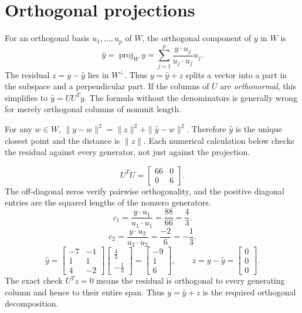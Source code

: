 \section{Orthogonal projections}
For an orthogonal basis $u_1,\ldots,u_p$ of $W$, the orthogonal component
of $y$ in $W$ is
\[
\widehat y=\operatorname{proj}_Wy
=\sum_{j=1}^p\frac{y\cdot u_j}{u_j\cdot u_j}u_j.
\]
The residual $z=y-\widehat y$ lies in $W^\perp$. Thus $y=\widehat y+z$
splits a vector into a part in the subspace and a perpendicular part.
If the columns of $U$ are \emph{orthonormal}, this simplifies to
$\widehat y=UU^Ty$. The formula without the denominators is generally
wrong for merely orthogonal columns of nonunit length.

For any $w\in W$, $\|y-w\|^2=\|z\|^2+\|\widehat y-w\|^2$.
Therefore $\widehat y$ is the unique closest point and the distance
is $\|z\|$. Each numerical calculation below checks the residual
against every generator, not just against the projection.

\[U^TU=\left[\begin{array}{rr}66&0\\0&6\end{array}\right].\]
The off-diagonal zeros verify pairwise orthogonality, and the positive diagonal entries are the squared lengths of the nonzero generators.
\[c_{1}=\frac{y\cdot u_{1}}{u_{1}\cdot u_{1}}=\frac{88}{66}=\frac{4}{3}.\]
\[c_{2}=\frac{y\cdot u_{2}}{u_{2}\cdot u_{2}}=\frac{-2}{6}=- \frac{1}{3}.\]
\[\widehat y=\left[\begin{array}{rr}-7&-1\\1&1\\4&-2\end{array}\right]\left[\begin{array}{r}\frac{4}{3}\\- \frac{1}{3}\end{array}\right]=\left[\begin{array}{r}-9\\1\\6\end{array}\right],\qquad z=y-\widehat y=\left[\begin{array}{r}0\\0\\0\end{array}\right].\]
The exact check $U^Tz=0$ means the residual is orthogonal to every generating column and hence to their entire span. Thus $y=\widehat y+z$ is the required orthogonal decomposition.

